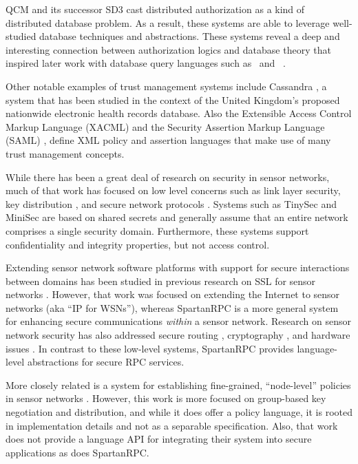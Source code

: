 QCM \cite{Gunter:DALSI,Gunter:GCR} and its successor SD3 \cite{Jim:STMSCE,Jim:DDQE} cast
distributed authorization as a kind of distributed database problem. As a result, these systems
are able to leverage well-studied database techniques and abstractions. These systems reveal a
deep and interesting connection between authorization logics and database theory that inspired
later work with database query languages such as \datalog\ and \datalogc\ \cite{Li:DCFTML}.

Other notable examples of trust management systems include Cassandra \cite{Becker:CFTMAEHR}, a
system that has been studied in the context of the United Kingdom's proposed nationwide
electronic health records database. Also the Extensible Access Control Markup Language (XACML)
\cite{OASIS:XACMLTC} and the Security Assertion Markup Language (SAML) \cite{OASIS:SSTC}, define
XML policy and assertion languages that make use of many trust management concepts.


While there has been a great deal of research on security in sensor networks, much of that work
has focused on low level concerns such as link layer security, key distribution
\cite{camtepe-bulent-05}, and secure network protocols \cite{1049776,fouladgar-3tls-2006}.
Systems such as TinySec \cite{karlog-tinysec-2004} and MiniSec \cite{luk-minisec-2007} are based
on shared secrets and generally assume that an entire network comprises a single security
domain. Furthermore, these systems support confidentiality and integrity properties, but not
access control.

Extending sensor network software platforms with support for secure interactions between domains
has been studied in previous research on SSL for sensor networks \cite{10.1109/WAINA.2009.47}.
However, that work was focused on extending the Internet to sensor networks (aka ``IP for
WSNs''), whereas SpartanRPC is a more general system for enhancing secure communications
\emph{within} a sensor network. Research on sensor network security has also addressed secure
routing \cite{senroute-ahnj03}, cryptography \cite{bertoni-2006}, and hardware issues
\cite{perrig-2004}. In contrast to these low-level systems, SpartanRPC provides language-level
abstractions for secure RPC services.

More closely related is a system for establishing fine-grained, ``node-level'' policies in
sensor networks \cite{Claycomb:2011:NNL:1889383.1889450}. However, this work is more focused on
group-based key negotiation and distribution, and while it does offer a policy language, it is
rooted in implementation details and not as a separable specification. Also, that work does not
provide a language API for integrating their system into secure applications as does SpartanRPC.

